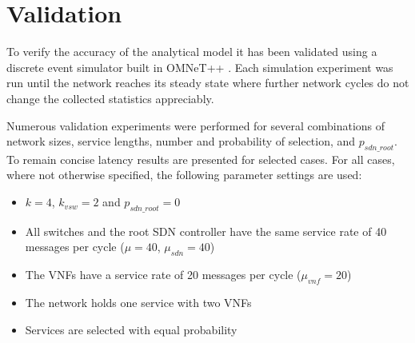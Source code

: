 
\section{Validation}
\label{sec:validation}
To verify the accuracy of the analytical model it has been validated using a discrete event simulator built in OMNeT++ \cite{VargaH08}. Each simulation experiment was run until the network reaches its steady state where further network cycles do not change the collected statistics appreciably.

Numerous validation experiments were performed for several combinations of network sizes, service lengths, number and probability of selection, and $p_{sdn\_root}$. To remain concise latency results are presented for selected cases. For all cases, where not otherwise specified, the following parameter settings are used:

\begin{itemize}
\item $k = 4$, $k_{vsw} = 2$ and $p_{sdn\_root} = 0$
\item All switches and the root SDN controller have the same service rate of 40 messages per cycle ($\mu = 40$, $\mu_{sdn} = 40$)
\item The VNFs have a service rate of 20 messages per cycle ($\mu_{vnf} = 20$)
\item The network holds one service with two VNFs
\item Services are selected with equal probability
\end{itemize}

